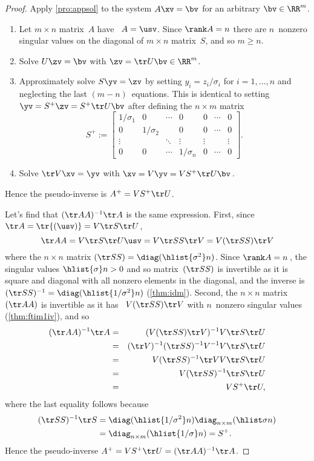 \begin{proof} 
Apply \cref{pro:appsol} to the system \(A\xv=\bv\) for an arbitrary \(\bv\in\RR^m\).
\begin{enumerate}
\item Let \(m\times n\) matrix~\(A\) have \svd\ \(A=\usv\).  
Since \(\rank A=n\) there are \(n\)~nonzero singular values on the diagonal of \(m\times n\) matrix~\(S\), and so \(m\geq n\).
\item Solve \(U\zv=\bv\) with \(\zv=\tr U\bv\in\RR^m\).
\item Approximately solve \(S\yv=\zv\) by setting \(y_i=z_i/\sigma_i\) for \(i=1,\ldots,n\) and neglecting the last \((m-n)\)~equations.
This is identical to setting \(\yv=S^+\zv=S^+\tr U\bv\) after defining the \(n\times m\) matrix
\begin{equation*}
S^+:=\begin{bmatrix} 1/\sigma_1&0&\cdots&0&0&\cdots&0
\\0&1/\sigma_2&&0&0&\cdots&0
\\\vdots&&\ddots&\vdots&\vdots&&\vdots
\\0&0&\cdots&1/\sigma_n&0&\cdots&0 \end{bmatrix}.
\end{equation*}
\item Solve \(\tr V\xv=\yv\) with \(\xv=V\yv=VS^+\tr U\bv\)\,.
\end{enumerate}
Hence the pseudo-inverse is \(A^+=VS^+\tr U\).

Let's find that \((\tr AA)^{-1}\tr A\) is the same expression.
First, since \(\tr A=\tr{(\usv)}=V\tr S\tr U\),
\begin{equation*}
\tr AA=V\tr S\tr U\usv=V\tr SS\tr V=V(\tr SS)\tr V
\end{equation*}
where the \(n\times n\) matrix \((\tr SS)=\diag(\hlist{\sigma^2}n)\).
Since \(\rank A=n\)\,, the singular values \(\hlist{\sigma}n>0\) and so matrix~\((\tr SS)\) is invertible as it is square and diagonal with all nonzero elements in the diagonal, and the inverse is \((\tr SS)^{-1}=\diag(\hlist{1/\sigma^2}n)\) (\cref{thm:idm}).
Second, the \(n\times n\) matrix \((\tr AA)\) is invertible as it has \svd\ \(V(\tr SS)\tr V\) with \(n\)~nonzero singular values (\cref{thm:ftim1iv}), and so
\begin{eqnarray*}
(\tr AA)^{-1}\tr A
&=&(V(\tr SS)\tr V)^{-1}V\tr S\tr U
\\&=&(\tr V)^{-1}(\tr SS)^{-1}V^{-1}V\tr S\tr U
\\&=&V(\tr SS)^{-1}\tr VV\tr S\tr U
\\&=&V(\tr SS)^{-1}\tr S\tr U
\\&=&VS^+\tr U,
\end{eqnarray*}
where the last equality follows because
\begin{align*}
(\tr SS)^{-1}\tr S
&=\diag(\hlist{1/\sigma^2}n)\diag_{n\times m}(\hlist\sigma n)
\\&=\diag_{n\times m}(\hlist{1/\sigma}n)=S^+.
\end{align*}
Hence the pseudo-inverse \(A^+=VS^+\tr U=(\tr AA)^{-1}\tr A\).
\end{proof}





